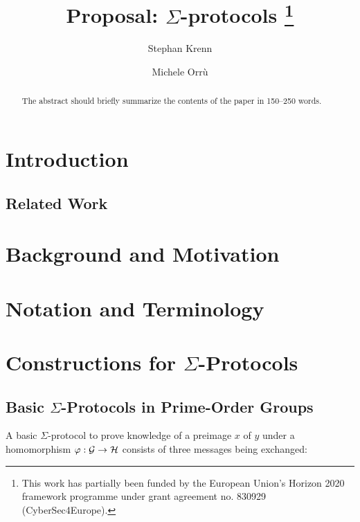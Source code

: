 \documentclass[runningheads]{llncs}
\begin{document}
\title{Proposal: $\Sigma$-protocols%
\thanks{This work has partially been funded by the European Union's Horizon 2020 framework programme under grant agreement no. 830929 (CyberSec4Europe).}}
%

\author{Stephan Krenn\and
        Michele Orr\`u}


%
\maketitle              %
%
\begin{abstract}
The abstract should briefly summarize the contents of the paper in
150--250 words.

\end{abstract}

\section{Introduction}
\subsection{Related Work}

\section{Background and Motivation}

\section{Notation and Terminology}

\section{Constructions for $\Sigma$-Protocols}
\subsection{Basic $\Sigma$-Protocols in Prime-Order Groups}
A basic $\Sigma$-protocol to prove knowledge of a preimage $x$ of $y$ under a homomorphism $\varphi:\mathcal{G}\to\mathcal{H}$ consists of three messages being exchanged:
\end{document}

